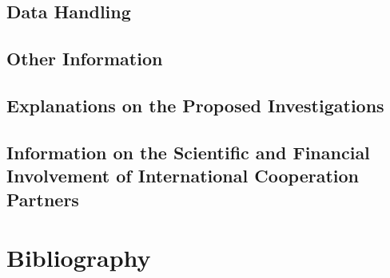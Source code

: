 \documentclass{scrartcl}
\begin{document}
\subsection{Data Handling}
\subsection{Other Information}
\subsection{Explanations on the Proposed Investigations}
\subsection{Information on the Scientific and Financial Involvement of International Cooperation Partners}
\section{Bibliography}

 




%





\end{document}
